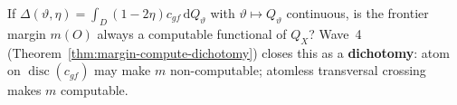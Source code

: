 \begin{conjecture}
\label{conj:dich-compute}
If $\Delta(\vartheta,\eta)=\int_D(1-2\eta)c_{gf}\,\mathrm dQ_\vartheta$ with
$\vartheta\mapsto Q_\vartheta$ continuous, is the frontier margin $m(O)$ always a computable
functional of $Q_X$? Wave~4 (Theorem~\ref{thm:margin-compute-dichotomy}) closes this as a
\textbf{dichotomy}: atom on $\operatorname{disc}(c_{gf})$ may make $m$ non-computable; atomless
transversal crossing makes $m$ computable.
\end{conjecture}
